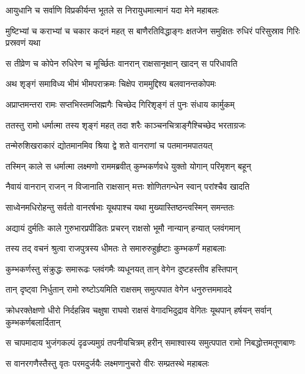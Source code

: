\twolineshloka
{आयुधानि च सर्वाणि विप्रकीर्यन्त भूतले}
{स निरायुधमात्मानं यदा मेने महाबलः} %

\threelineshloka
{मुष्टिभ्यां च कराभ्यां च चकार कदनं महत्}
{स बाणैरतिविद्धाङ्गः क्षतजेन समुक्षितः}
{रुधिरं परिसुस्राव गिरिः प्रस्रवणं यथा} %

\twolineshloka
{स तीव्रेण च कोपेन रुधिरेण च मूर्च्छितः}
{वानरान् राक्षसानृक्षान् खादन् स परिधावति} %

\twolineshloka
{अथ शृङ्गं समाविध्य भीमं भीमपराक्रमः}
{चिक्षेप राममुद्दिश्य बलवानन्तकोपमः} %

\twolineshloka
{अप्राप्तमन्तरा रामः सप्तभिस्तमजिह्मगैः}
{चिच्छेद गिरिशृङ्गं तं पुनः संधाय कार्मुकम्} %

\twolineshloka
{ततस्तु रामो धर्मात्मा तस्य शृङ्गं महत् तदा}
{शरैः काञ्चनचित्राङ्गैश्चिच्छेद भरताग्रजः} %

\twolineshloka
{तन्मेरुशिखराकारं द्योतमानमिव श्रिया}
{द्वे शते वानराणां च पतमानमपातयत्} %

\twolineshloka
{तस्मिन् काले स धर्मात्मा लक्ष्मणो राममब्रवीत्}
{कुम्भकर्णवधे युक्तो योगान् परिमृशन् बहून्} %

\twolineshloka
{नैवायं वानरान् राजन् न विजानाति राक्षसान्}
{मत्तः शोणितगन्धेन स्वान् परांश्चैव खादति} %

\twolineshloka
{साध्वेनमधिरोहन्तु सर्वतो वानरर्षभाः}
{यूथपाश्च यथा मुख्यास्तिष्ठन्त्वस्मिन् समन्ततः} %

\twolineshloka
{अद्यायं दुर्मतिः काले गुरुभारप्रपीडितः}
{प्रचरन् राक्षसो भूमौ नान्यान् हन्यात् प्लवंगमान्} %

\twolineshloka
{तस्य तद् वचनं श्रुत्वा राजपुत्रस्य धीमतः}
{ते समारुरुहुर्हृष्टाः कुम्भकर्णं महाबलाः} %

\twolineshloka
{कुम्भकर्णस्तु संक्रुद्धः समारूढः प्लवंगमैः}
{व्यधूनयत् तान् वेगेन दुष्टहस्तीव हस्तिपान्} %

\twolineshloka
{तान् दृष्ट्वा निर्धुतान् रामो रुष्टोऽयमिति राक्षसम्}
{समुत्पपात वेगेन धनुरुत्तममाददे} %

\threelineshloka
{क्रोधरक्तेक्षणो धीरो निर्दहन्निव चक्षुषा}
{राघवो राक्षसं वेगादभिदुद्राव वेगितः}
{यूथपान् हर्षयन् सर्वान् कुम्भकर्णबलार्दितान्} %

\twolineshloka
{स चापमादाय भुजंगकल्पं दृढज्यमुग्रं तपनीयचित्रम्}
{हरीन् समाश्वास्य समुत्पपात रामो निबद्धोत्तमतूणबाणः} %

\twolineshloka
{स वानरगणैस्तैस्तु वृतः परमदुर्जयैः}
{लक्ष्मणानुचरो वीरः सम्प्रतस्थे महाबलः} %

